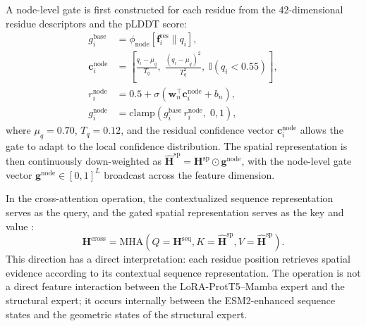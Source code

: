 \documentclass[12pt]{article}
\begin{document}
A node-level gate is first constructed for each residue from the
42-dimensional residue descriptors and the pLDDT score:
\begin{equation}
    \begin{aligned}
        g_i^{\mathrm{base}} &= \phi_{\mathrm{node}}\left[\mathbf f_i^{\mathrm{res}} \parallel q_i\right],\\
        \mathbf c_i^{\mathrm{node}} &= \left[\frac{q_i - \mu_q}{T_q},\; \frac{(q_i - \mu_q)^2}{T_q^2},\; \mathbb{I}(q_i < 0.55)\right],\\
        r_i^{\mathrm{node}} &= 0.5 + \sigma\left(\mathbf w_n^{\top}
        \mathbf c_i^{\mathrm{node}} + b_n\right),\\
        g_i^{\mathrm{node}} &= \mathrm{clamp}\left(g_i^{\mathrm{base}}\,
        r_i^{\mathrm{node}},\; 0, 1\right),
    \end{aligned}
    \label{eq:node_gate}
\end{equation}
where $\mu_q = 0.70$, $T_q = 0.12$, and the residual confidence vector
$\mathbf c_i^{\mathrm{node}}$ allows the gate to adapt to the local
confidence distribution. The spatial representation is then
continuously down-weighted as
$\widehat{\mathbf H}^{\mathrm{sp}} = \mathbf H^{\mathrm{sp}} \odot
\mathbf g^{\mathrm{node}}$, with the node-level gate vector
$\mathbf g^{\mathrm{node}} \in [0,1]^L$ broadcast across the feature
dimension.

In the cross-attention operation, the contextualized sequence representation
serves as the query, and the gated spatial representation serves as the key
and value \cite{vaswani2017transformer}:
\begin{equation}
    \mathbf H^{\mathrm{cross}} = \mathrm{MHA}\left(Q = \mathbf H^{\mathrm{seq}},
    K = \widehat{\mathbf H}^{\mathrm{sp}},
    V = \widehat{\mathbf H}^{\mathrm{sp}}\right).
    \label{eq:cross_attn_sp}
\end{equation}
This direction has a direct interpretation: each residue position retrieves
spatial evidence according to its contextual sequence representation. The
operation is not a direct feature interaction between the LoRA-ProtT5--Mamba
expert and the structural expert; it occurs internally between the
ESM2-enhanced sequence states and the geometric states of the structural
expert.
\end{document}
